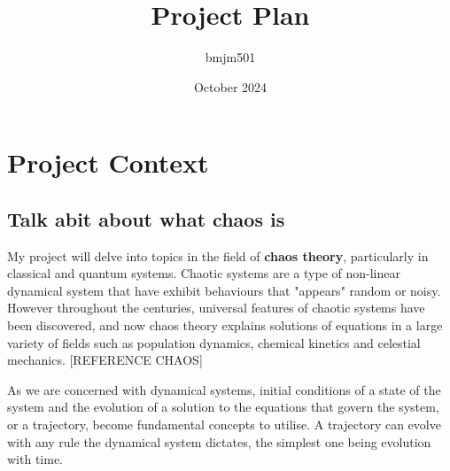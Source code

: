 \documentclass[12pt,a4paper]{amsart}
\title{Project Plan}
\author{bmjm501 }
\date{October 2024}
\begin{document}
\maketitle









\section{Project Context}

\subsection{Talk abit about what chaos is}
My project will delve into topics in the field of \textbf{chaos theory}, particularly in classical and quantum systems. Chaotic systems are a type of non-linear dynamical system that have exhibit behaviours that "appears" random or noisy. However throughout the centuries, universal features of chaotic systems have been discovered, and now chaos theory explains solutions of equations in a large variety of fields such as population dynamics, chemical kinetics and celestial mechanics. [REFERENCE CHAOS] 

As we are concerned with dynamical systems, initial conditions of a state of the system and the evolution of a solution to the equations that govern the system, or a trajectory, become fundamental concepts to utilise. A trajectory can evolve with any rule the dynamical system dictates, the simplest one being evolution with time.
\end{document}
